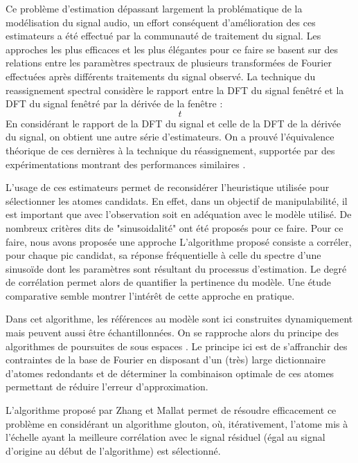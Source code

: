
Ce problème d'estimation dépassant largement la problématique de la modélisation du signal audio, un effort conséquent d'amélioration des ces estimateurs a été effectué par la communauté de traitement du signal. Les approches les plus efficaces et les plus élégantes pour ce faire se basent sur des relations entre les paramètres spectraux de plusieurs transformées de Fourier effectuées après différents traitements du signal observé. La technique du reassignement spectral\cite{auger1995improving} considère le rapport entre la DFT du signal fenêtré et la DFT du signal fenêtré par la dérivée de la fenêtre :
\begin{equation}
t
\end{equation}
En considérant le rapport de la DFT du signal et celle de la DFT de la dérivée du signal, on obtient une autre série d'estimateurs. On a prouvé l'équivalence théorique de ces dernières à la technique du réassignement, supportée par des expérimentations montrant des performances similaires \cite{lagrangeJaes07}.

L'usage de ces estimateurs permet de reconsidérer l'heuristique utilisée pour sélectionner les atomes candidats. En effet, dans un objectif de manipulabilité, il est important que  avec l'observation  soit en adéquation avec le modèle utilisé. De nombreux critères dits de "sinusoidalité" ont été proposés pour ce faire. Pour ce faire, nous avons proposée une approche \cite{peak-selection} L'algorithme proposé consiste a corréler, pour chaque pic candidat, sa réponse fréquentielle à celle du spectre d'une sinusoïde dont les paramètres sont résultant du processus d'estimation. Le degré de corrélation permet alors de quantifier la pertinence du modèle.
Une étude comparative \cite{wells2010comparative} semble montrer l'intérêt de cette approche en pratique.

Dans cet algorithme, les références au modèle sont ici construites dynamiquement mais peuvent aussi être échantillonnées. On se rapproche alors du principe des algorithmes de poursuites de sous espaces \cite{}. Le principe ici est de s'affranchir des contraintes de la base de Fourier en disposant d'un (très) large dictionnaire d'atomes redondants et de déterminer la combinaison optimale de ces atomes permettant de réduire l'erreur d'approximation.

L'algorithme proposé par Zhang et Mallat \cite{mallat1993matching} permet de résoudre efficacement ce problème en considérant un algorithme glouton, où, itérativement, l'atome mis à l'échelle ayant la meilleure corrélation avec le signal résiduel (égal au signal d'origine au début de l'algorithme) est sélectionné.


